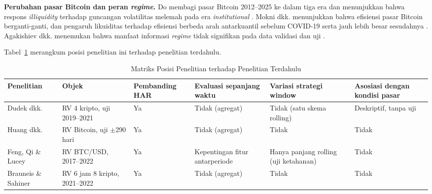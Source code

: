 \textbf{Perubahan pasar Bitcoin dan peran \textit{regime}.} Do membagi pasar
Bitcoin 2012--2025 ke dalam tiga era dan menunjukkan bahwa respons
\textit{illiquidity} terhadap guncangan volatilitas melemah pada era
\textit{institutional} \cite{do2026}. Mokni dkk. menunjukkan bahwa efisiensi
pasar Bitcoin berganti-ganti, dan pengaruh likuiditas terhadap efisiensi
berbeda arah antarkuantil sebelum COVID-19 serta jauh lebih besar sesudahnya
\cite{mokni2024}. Agakishiev dkk.
menemukan bahwa manfaat informasi \textit{regime} tidak signifikan pada data
validasi dan uji \cite{agakishiev2025}.

Tabel~\ref{tab:posisi} merangkum posisi penelitian ini terhadap penelitian
terdahulu.

\begin{table}[htbp]
  \caption{Matriks Posisi Penelitian terhadap Penelitian Terdahulu}
  \label{tab:posisi}
  \centering
  \begingroup
  \footnotesize
  \setlength{\tabcolsep}{3pt}
  \begin{tabular}{|>{\raggedright\arraybackslash}p{}%
                  |>{\raggedright\arraybackslash}p{}%
                  |>{\raggedright\arraybackslash}p{}%
                  |>{\raggedright\arraybackslash}p{}%
                  |>{\raggedright\arraybackslash}p{}%
                  |>{\raggedright\arraybackslash}p{}|}
    \hline
    \textbf{Penelitian} & \textbf{Objek} & \textbf{Pembanding HAR} &
    \textbf{Evaluasi sepanjang waktu} & \textbf{Variasi strategi window} &
    \textbf{Asosiasi dengan kondisi pasar} \\
    \hline
    Dudek dkk. \cite{dudek2024} & RV 4 kripto, uji 2019--2021 & Ya &
    Tidak (agregat) & Tidak (satu skema rolling) & Deskriptif, tanpa uji \\
    \hline
    Huang dkk. \cite{huang2024} & RV Bitcoin, uji $\pm$290 hari & Ya &
    Tidak (agregat) & Tidak & Tidak \\
    \hline
    Feng, Qi \& Lucey \cite{feng2024ml} & RV BTC/USD, 2017--2022 & Ya &
    Kepentingan fitur antarperiode & Hanya panjang rolling (uji ketahanan) &
    Tidak \\
    \hline
    Brauneis \& Sahiner \cite{brauneis2026} & RV 6 jam 8 kripto, 2021--2022 &
    Ya & Tidak (agregat) & Tidak & Tidak \\

\end{tabular}
\end{table}
